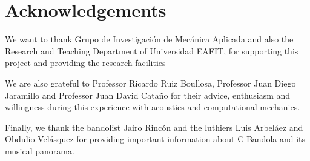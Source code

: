 \section{Acknowledgements}

We want to thank Grupo de Investigaci\'on de Mec\'anica Aplicada and also the Research and Teaching Department of Universidad EAFIT, for supporting this project and providing the research facilities

We are also grateful to Professor Ricardo Ruiz Boullosa, Professor Juan Diego Jaramillo and Professor Juan David Cata\~no for their advice, enthusiasm and willingness during this experience with acoustics and computational mechanics.

Finally, we thank the bandolist Jairo Rinc\'on and the luthiers Luis Arbel\'aez and Obdulio Vel\'asquez for providing important information about C-Bandola and its musical panorama.


